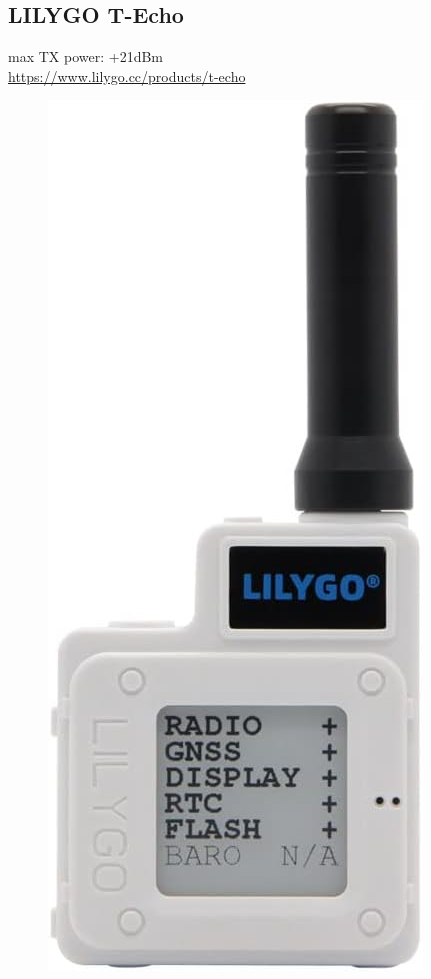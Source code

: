 \documentclass[12pt,a4paper]{article}
\begin{document}
\subsection{LILYGO T-Echo}
max TX power: +21dBm\\
\url{https://www.lilygo.cc/products/t-echo}\\
\begin{figure}[h]
	\includegraphics[scale=0.1]{t-echo.jpg}
\end{figure}\\ \\
\end{document}
